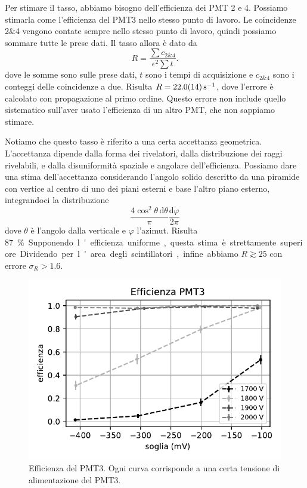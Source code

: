 \documentclass[a4paper]{article}
\newcommand*\de{\mathrm{d}}
\begin{document}
Per stimare il tasso, abbiamo bisogno dell'efficienza dei PMT 2 e 4.
Possiamo stimarla come l'efficienza del PMT3 nello stesso punto di lavoro.
Le coincidenze 2\&4 vengono contate sempre nello stesso punto di lavoro,
quindi possiamo sommare tutte le prese dati.
Il tasso allora è dato da
\begin{equation*}
	R = \frac{\sum c_{2\&4}}{\epsilon^2 \sum t}.
\end{equation*}
dove le somme sono sulle prese dati,
$t$ sono i tempi di acquisizione
e $c_{2\&4}$ sono i conteggi delle coincidenze a due.
Risulta $R=\SI{22.0 \pm 1.4}{s^{-1}}$,
dove l'errore è calcolato con propagazione al primo ordine.
Questo errore non include quello sistematico sull'aver usato l'efficienza di un altro PMT,
che non sappiamo stimare.

Notiamo che questo tasso è riferito a una certa accettanza geometrica.
L'accettanza dipende dalla forma dei rivelatori,
dalla distribuzione dei raggi rivelabili,
e dalla disuniformità spaziale e angolare dell'efficienza.
Possiamo dare una stima dell'accettanza considerando l'angolo solido
descritto da una piramide con vertice al centro di uno dei piani esterni e base l'altro piano esterno,
integrandoci la distribuzione
\[\frac{4\cos^2\theta\,\de\theta}{\pi}\frac{\de\varphi}{2\pi}\]
dove $\theta$ è l'angolo dalla verticale e $\varphi$ l'azimut.
Risulta \SI{87}\%.
Supponendo l'efficienza uniforme,
questa stima è strettamente superiore.
Dividendo per l'area degli scintillatori, infine abbiamo
$R \gtrsim 25$ con errore $\sigma_R>1.6$.

\begin{figure}
	\centering
	\includegraphics[width=8 cm]{efficienza}
	\caption{\label{eff}%
	Efficienza del PMT3.
	Ogni curva corrisponde a una certa tensione di alimentazione del PMT3.}
\end{figure}
\end{document}
